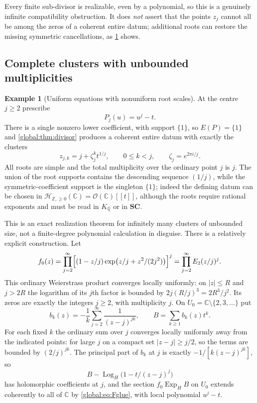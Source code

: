 \documentclass[11pt,letterpaper]{article}
\theoremstyle{definition}
\newtheorem{example}[example]{Example}
\theoremstyle{remark}
\newcommand{\SC}{\mathbf{SC}}
\newcommand{\C}{\mathbb C}
\newcommand{\Z}{\mathbb Z}
\newcommand{\Q}{\mathbb Q}
\newcommand{\OO}{\mathcal O}
\newcommand{\ExpH}{\operatorname{Exp}_{H}}
\newcommand{\LogH}{\operatorname{Log}_{H}}
\newcommand{\abs}[1]{\left|#1\right|}
\numberwithin{equation}{section}
\begin{document}
Every finite sub-divisor is realizable, even by a polynomial, so this is a genuinely infinite compatibility obstruction. It does \emph{not} assert that the points $z_j$ cannot all be among the zeros of a coherent entire datum; additional roots can restore the missing symmetric cancellations, as \cref{global:ex:fullclusters} shows.

\subsection{Complete clusters with unbounded multiplicities}

\begin{example}[Uniform equations with nonuniform root scales]\label{global:ex:fullclusters}
At the centre $j\ge2$ prescribe
\begin{equation}\label{global:eq:unboundedclusters}
  P_j(u)=u^j-t .
\end{equation}
There is a single nonzero lower coefficient, with support $\{1\}$, so $E(P)=\{1\}$ and \cref{global:thm:divisor} produces a coherent entire datum with exactly the clusters
\[
  z_{j,k}=j+\zeta_j^kt^{1/j},\qquad 0\le k<j,\qquad \zeta_j=e^{2\pi i/j}.
\]
All roots are simple and the total multiplicity over the ordinary point $j$ is $j$. The union of the root supports contains the descending sequence $(1/j)$, while the symmetric-coefficient support is the singleton $\{1\}$; indeed the defining datum can be chosen in $\mathscr H_{\Z,\ge0}(\C)=\OO(\C)[[t]]$, although the roots require rational exponents and must be read in $K_\Q$ or in $\SC$.
\end{example}

This is an exact realization theorem for infinitely many clusters of unbounded size, not a finite-degree polynomial calculation in disguise. There is a relatively explicit construction. Let
\begin{equation}\label{global:eq:f0product}
  f_0(z)=\prod_{j=2}^{\infty}
  \Bigl[(1-z/j)\exp\bigl(z/j+z^2/(2j^2)\bigr)\Bigr]^{j}
  =\prod_{j=2}^\infty E_2(z/j)^j .
\end{equation}
This ordinary Weierstrass product converges locally uniformly: on $\abs z\le R$ and $j>2R$ the logarithm of its $j$th factor is bounded by $2j(R/j)^3=2R^3/j^2$. Its zeros are exactly the integers $j\ge2$, with multiplicity $j$. On $U_0=\C\setminus\{2,3,\dots\}$ put
\begin{equation}\label{global:eq:bn}
  b_k(z)=-\frac1k\sum_{j=2}^{\infty}\frac1{(z-j)^{jk}},
  \qquad B=\sum_{k\ge1}b_k(z)t^k .
\end{equation}
For each fixed $k$ the ordinary sum over $j$ converges locally uniformly away from the indicated points: for large $j$ on a compact set $\abs{z-j}\ge j/2$, so the terms are bounded by $(2/j)^{jk}$. The principal part of $b_k$ at $j$ is exactly $-1/[k(z-j)^{jk}]$, so
\[
  B-\LogH\bigl(1-t/(z-j)^j\bigr)
\]
has holomorphic coefficients at $j$, and the section $f_0\ExpH B$ on $U_0$ extends coherently to all of $\C$ by \eqref{global:eq:Fglue}, with local polynomial $u^j-t$.
\end{document}
